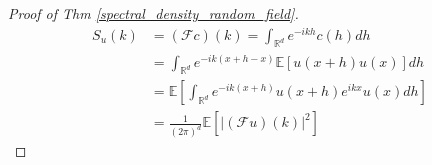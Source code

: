 \begin{proof}[Proof of Thm \ref{spectral_density_random_field}]
    \begin{equation}
    \begin{aligned}
      S_u(k)&=\left(\mathcal{F}c\right)(k)= \int_{\mathbb{R}^d} e^{-ik h}c(h) dh\\
      &= \int_{\mathbb{R}^d} e^{-ik(x+h - x)}\mathbb{E}\left[u(x+h)u(x)\right] dh\\
      &= \mathbb{E}\left[\int_{\mathbb{R}^d} e^{-ik(x+h)}u(x+h)e^{ikx}u(x) dh\right]\\
      &= \frac{1}{(2\pi)^{d}}\mathbb{E}\left[\left|(\mathcal{F}u)(k)\right|^2\right]
    \end{aligned}
  \end{equation}
\end{proof}

